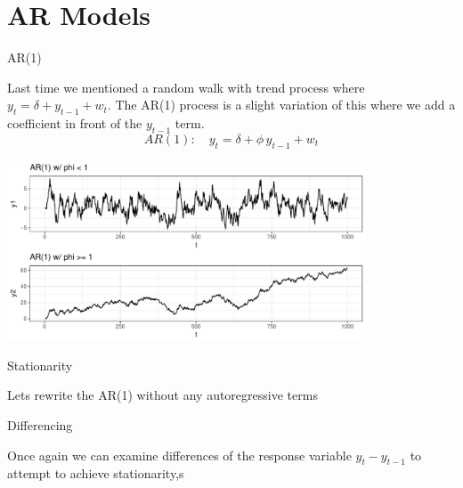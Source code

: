 \documentclass[11pt,ignorenonframetext,]{beamer}
\begin{document}
\section{AR Models}\label{ar-models}

\begin{frame}{AR(1)}

Last time we mentioned a random walk with trend process where
\(y_t = \delta + y_{t-1} + w_t\). The AR(1) process is a slight
variation of this where we add a coefficient in front of the \(y_{t-1}\)
term. \[AR(1): \quad y_t = \delta + \phi \, y_{t-1} + w_t \]

\begin{center}\includegraphics[width=0.8\textwidth]{Lec7_files/figure-beamer/unnamed-chunk-20-1} \end{center}

\end{frame}

\begin{frame}[t]{Stationarity}

Lets rewrite the AR(1) without any autoregressive terms

\end{frame}

\begin{frame}[t]{Differencing}

Once again we can examine differences of the response variable
\(y_t - y_{t-1}\) to attempt to achieve stationarity,s

\end{frame}
\end{document}

